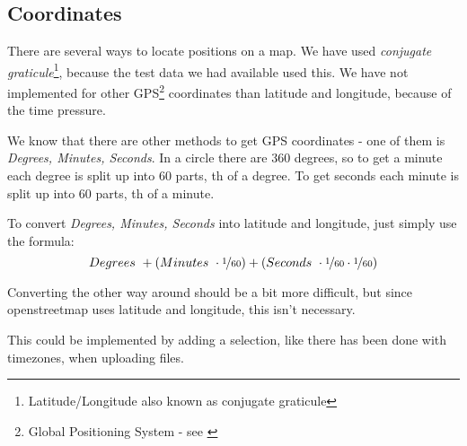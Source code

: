 \subsection{Coordinates}
\label{sec:coordinates}
There are several ways to locate positions on a map. We have used \emph{conjugate graticule}\footnote{Latitude/Longitude also known as conjugate graticule}, because the test data we had available used this. We have not implemented for other GPS\footnote{Global Positioning System - see \cite{GPS}} coordinates than latitude and longitude, because of the time pressure.

We know that there are other methods to get GPS coordinates - one of them is \emph{Degrees, Minutes, Seconds}. In a circle there are 360 degrees, so to get a minute each degree is split up into 60 parts, th of a degree. To get seconds each minute is split up into 60 parts, th of a minute.

To convert \emph{Degrees, Minutes, Seconds} into latitude and longitude, just simply use the formula:
\begin{equation}
Degrees~ + \left(Minutes~ \cdot \nicefrac{1}{60}\right) + \left(Seconds~ \cdot \nicefrac{1}{60} \cdot \nicefrac{1}{60}\right)
\end{equation}

Converting the other way around should be a bit more difficult, but since openstreetmap uses latitude and longitude, this isn't necessary.

This could be implemented by adding a selection, like there has been done with timezones, when uploading files.
